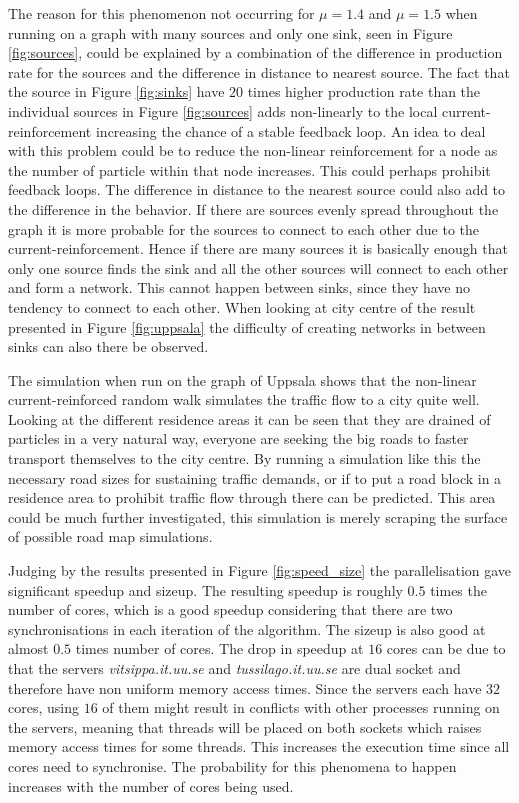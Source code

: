The reason for this phenomenon not occurring for $\mu = 1.4$ and $\mu = 1.5$ when running on a graph with many sources and only one sink, seen in Figure \ref{fig:sources}, could be explained by a combination of the difference in production rate for the sources and the difference in distance to nearest source. The fact that the source in Figure \ref{fig:sinks} have $20$ times higher production rate than the individual sources in Figure \ref{fig:sources} adds non-linearly to the local current-reinforcement increasing the chance of a stable feedback loop. An idea to deal with this problem could be to reduce the non-linear reinforcement for a node as the number of particle within that node increases. This could perhaps prohibit feedback loops. The difference in distance to the nearest source could also add to the difference in the behavior. If there are sources evenly spread throughout the graph it is more probable for the sources to connect to each other due to the current-reinforcement. Hence if there are many sources it is basically enough that only one source finds the sink and all the other sources will connect to each other and form a network. This cannot happen between sinks, since they have no tendency to connect to each other. When looking at city centre of the result presented in Figure \ref{fig:uppsala} the difficulty of creating networks in between sinks can also there be observed.

The simulation when run on the graph of Uppsala shows that the non-linear current-reinforced random walk simulates the traffic flow to a city quite well. Looking at the different residence areas it can be seen that they are drained of particles in a very natural way, everyone are seeking the big roads to faster transport themselves to the city centre. By running a simulation like this the necessary road sizes for sustaining traffic demands, or if to put a road block in a residence area to prohibit traffic flow through there can be predicted. This area could be much further investigated, this simulation is merely scraping the surface of possible road map simulations.

Judging by the results presented in Figure \ref{fig:speed_size} the parallelisation gave significant speedup and sizeup. The resulting speedup is roughly $0.5$ times the number of cores, which is a good speedup considering that there are two synchronisations in each iteration of the algorithm. The sizeup is also good at almost $0.5$ times number of cores. The drop in speedup at $16$ cores can be due to that the servers \textit{vitsippa.it.uu.se} and \textit{tussilago.it.uu.se} are dual socket and therefore have non uniform memory access times. Since the servers each have $32$ cores, using $16$ of them might result in conflicts with other processes running on the servers, meaning that threads will be placed on both sockets which raises memory access times for some threads. This increases the execution time since all cores need to synchronise. The probability for this phenomena to happen increases with the number of cores being used.

